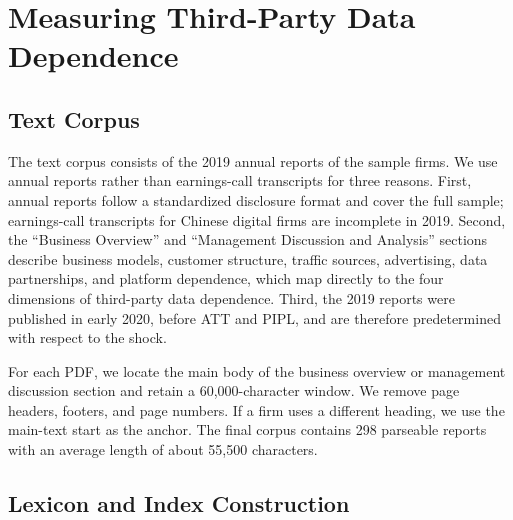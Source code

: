 \section{Measuring Third-Party Data Dependence}
\label{sec:measurement}

\subsection{Text Corpus}

The text corpus consists of the 2019 annual reports of the sample firms. We use annual reports rather than earnings-call transcripts for three reasons. First, annual reports follow a standardized disclosure format and cover the full sample; earnings-call transcripts for Chinese digital firms are incomplete in 2019. Second, the ``Business Overview'' and ``Management Discussion and Analysis'' sections describe business models, customer structure, traffic sources, advertising, data partnerships, and platform dependence, which map directly to the four dimensions of third-party data dependence. Third, the 2019 reports were published in early 2020, before ATT and PIPL, and are therefore predetermined with respect to the shock.

For each PDF, we locate the main body of the business overview or management discussion section and retain a 60,000-character window. We remove page headers, footers, and page numbers. If a firm uses a different heading, we use the main-text start as the anchor. The final corpus contains 298 parseable reports with an average length of about 55,500 characters.

\subsection{Lexicon and Index Construction}

